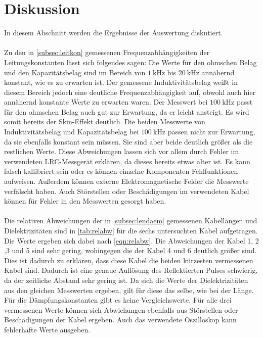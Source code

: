 \section{Diskussion}
\label{sec:Diskussion}
In diesem Abschnitt werden die Ergebnisse der Auswertung diskutiert. 
\\\\
Zu den in \autoref{subsec:leitkon} gemessenen Frequenzabhängigkeiten der Leitungskonstanten lässt sich folgendes sagen:
Die Werte für den ohmschen Belag und den Kapazitätsbelag sind im Bereich von $\qty{1}{\kilo\hertz}$ bis $\qty{20}{\kilo\hertz}$ annähernd konstant, wie es zu erwarten ist.
Der gemessene Induktivitätsbelag weißt in diesem Bereich jedoch eine deutliche Frequenzabhängigkeit auf, obwohl auch hier annähernd konstante Werte zu erwarten waren. 
Der Messwert bei $\qty{100}{\kilo\hertz}$ passt für den ohmschen Belag auch gut zur Erwartung, da er leicht ansteigt. 
Es wird somit bereits der Skin-Effekt deutlich.
Die beiden Messwerte von Induktivitätsbelag und Kapazitätsbelag bei $\qty{100}{\kilo\hertz}$ passen nicht zur Erwartung, da sie ebenfalls konstant sein müssen.
Sie sind aber beide deutlich größer als die restlichen Werte.
Diese Abweichungen lassen sich vor allem durch Fehler im verwendeten LRC-Messgerät erklären, da dieses bereits etwas älter ist. 
Es kann falsch kallibriert sein oder es können einzelne Komponenten Fehlfunktionen aufweisen. 
Außerdem können externe Elektromagnetische Felder die Messwerte verfälscht haben. 
Auch Störstellen oder Beschädigungen im verwendeten Kabel können für Fehler in den Messwerten gesorgt haben. 
\\\\
Die relativen Abweichungen der in \autoref{subsec:lendaem} gemessenen Kabellängen und Dielektrizitäten sind in \autoref{tab:relabw} für die sechs untersuchten Kabel aufgetragen.
Die Werte ergeben sich dabei nach \autoref{eqn:relabw}. 
Die Abweichungen der Kabel 1, 2 ,3 und 5 sind sehr gering, wohingegen die der Kabel 4 und 6 deutlich größer sind. 
Dies ist dadurch zu erklären, dass diese Kabel die beiden kürzesten vermessenen Kabel sind. 
Dadurch ist eine genaue Auflösung des Reflektierten Pulses schwierig, da der zeitliche Abstand sehr gering ist. 
Da sich die Werte der Dielektrizitäten aus den gleichen Messwerten ergeben, gilt für diese das selbe, wie bei der Länge. 
Für die Dämpfungskonstanten gibt es keine Vergleichswerte. 
Für alle drei vermessenen Werte können sich Abwichungen ebenfalls aus Störstellen oder Beschädigungen der Kabel ergeben.
Auch das verwendete Oszilloskop kann fehlerhafte Werte ausgeben. 
